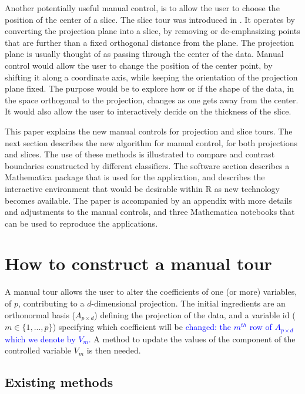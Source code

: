 \documentclass[]{interact}
\theoremstyle{plain}%
\theoremstyle{definition}
\theoremstyle{remark}
\begin{document}
Another potentially useful manual control, is to allow the user to
choose the position of the center of a slice. The slice tour was
introduced in \citet{slicetour}. It operates by converting the
projection plane into a slice, by removing or de-emphasizing points that
are further than a fixed orthogonal distance from the plane. The
projection plane is usually thought of as passing through the center of
the data. Manual control would allow the user to change the position of
the center point, by shifting it along a coordinate axis, while keeping
the orientation of the projection plane fixed. The purpose would be to
explore how or if the shape of the data, in the space orthogonal to the
projection, changes as one gets away from the center. It would also
allow the user to interactively decide on the thickness of the slice.

This paper explains the new manual controls for projection and slice
tours. The next section describes the new algorithm for manual control,
for both projections and slices. The use of these methods is illustrated
to compare and contrast boundaries constructed by different classifiers.
The software section describes a Mathematica \citep{Mathematica} package
that is used for the application, and describes the interactive
environment that would be desirable within R \citep{rref} as new
technology becomes available. The paper is accompanied by an appendix
with more details and adjustments to the manual controls, and three
Mathematica notebooks that can be used to reproduce the applications.

\hypertarget{sec:method}{%
\section{How to construct a manual tour}\label{sec:method}}

A manual tour allows the user to alter the coefficients of one (or more)
variables, of \(p\), contributing to a \(d\)-dimensional projection. The
initial ingredients are an orthonormal basis (\(A_{p\times d}\))
defining the projection of the data, and a variable id
(\(m \in \{1, ..., p\}\)) specifying which coefficient will be
\textcolor{blue}{changed: the $m^{th}$ row of $A_{p\times d}$ which we denote by $V_m$.}
A method to update the values of the component of the controlled
variable \(V_m\) is then needed.

\hypertarget{existing-methods}{%
\subsection{Existing methods}\label{existing-methods}}
\end{document}
